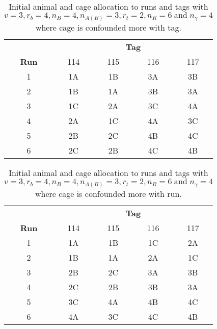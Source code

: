 \documentclass[article]{jss}
\begin{document}
\begin{table}[ht]                                       
\centering                                              
\caption{Initial animal and cage allocation to runs and tags with $v = 3, r_b = 4, n_B = 4, n_{A(B)} = 3, r_t = 2, n_R = 6 \; \mathrm{and} \; n_\gamma = 4$ where cage is confounded more with tag.}           
\begin{tabular}[t]{c|cccc}                                 
 & \multicolumn{4}{c}{{\bf Tag}} \\                     
{\bf Run}  & 114 & 115 & 116 & 117 \\                   
\hline                                                  
1  & 1A & 1B & 3A & 3B \\  
2  & 1B & 1A & 3B & 3A \\  
3  & 1C & 2A & 3C & 4A \\  
4  & 2A & 1C & 4A & 3C \\  
5  & 2B & 2C & 4B & 4C \\  
6  & 2C & 2B & 4C & 4B \\        
\end{tabular}                                           
\label{tab:iniCagAniDesEX2}                                  
\end{table}    

\begin{table}[ht]                                       
\centering                                              
\caption{Initial animal and cage allocation to runs and tags with $v = 3, r_b = 4, n_B = 4, n_{A(B)} = 3, r_t = 2, n_R = 6 \; \mathrm{and} \; n_\gamma = 4$ where cage is confounded more with run.}           
\begin{tabular}[t]{c|cccc}                                 
 & \multicolumn{4}{c}{{\bf Tag}} \\                     
{\bf Run}  & 114 & 115 & 116 & 117 \\                   
\hline                                                  
1  & 1A & 1B & 1C & 2A \\ 
2  & 1B & 1A & 2A & 1C \\ 
3  & 2B & 2C & 3A & 3B \\ 
4  & 2C & 2B & 3B & 3A \\ 
5  & 3C & 4A & 4B & 4C \\ 
6  & 4A & 3C & 4C & 4B \\    
\end{tabular}                                           
\label{tab:iniCagAniDesEX1}                                  
\end{table}    
\end{document}
